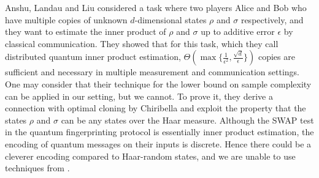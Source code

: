 Anshu, Landau and Liu \cite{ALL22} considered a task where two players
Alice and Bob who have multiple copies of unknown $d$-dimensional states $\rho$ and $\sigma$ respectively, and they want to estimate the inner product of $\rho$ and $\sigma$ up to additive error $\epsilon$ by classical communication. They showed that for this task, which they call distributed quantum inner product estimation, $\Theta( \max \{ \frac{1}{\epsilon^2}, \frac{\sqrt{d}}{\epsilon} \})$ copies are sufficient and necessary in multiple measurement and communication settings. One may consider that their technique for the lower bound on sample complexity can be applied in our setting, but we cannot. To prove it, they derive a connection with optimal cloning by Chiribella \cite{Chi10} and exploit the property that the states $\rho$ and $\sigma$ can be any states over the Haar measure. Although the SWAP test in the quantum fingerprinting protocol is essentially inner product estimation, the encoding of quantum messages on their inputs is discrete. Hence there could be a cleverer encoding compared to Haar-random states, and we are unable to use techniques from \cite{ALL22}.